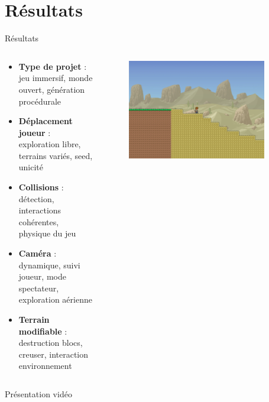 \documentclass[aspectratio=169]{beamer}
\begin{document}
\section{Résultats}

\begin{frame}{Résultats}
    \begin{columns}
        \centering
        \begin{column}{0.5\textwidth}
            \centering
            \begin{itemize}
                \item \textbf{Type de projet} : jeu immersif, monde ouvert, génération procédurale
                \item \textbf{Déplacement joueur} : exploration libre, terrains variés, seed, unicité
                \item \textbf{Collisions} : détection, interactions cohérentes, physique du jeu
                \item \textbf{Caméra} : dynamique, suivi joueur, mode spectateur, exploration aérienne
                \item \textbf{Terrain modifiable} : destruction blocs, creuser, interaction environnement
            \end{itemize}
        \end{column}
        \begin{column}{0.5\textwidth}
            \centering
            \begin{figure}
                \centering
                \captionsetup{format=sanslabel}
                \includegraphics[width=0.9\textwidth]{assets/background_1.png}
            \end{figure}
        \end{column}
    \end{columns}
\end{frame}
\begin{frame}{Présentation vidéo}
    \centering
\end{frame}
\end{document}
